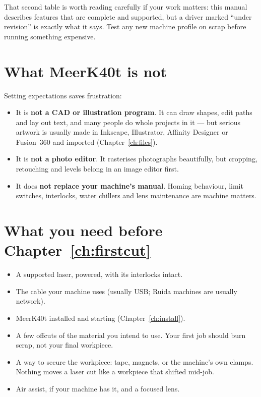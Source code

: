 \noindent That second table is worth reading carefully if your work matters: this
manual describes features that are complete and supported, but a driver marked
``under revision'' is exactly what it says. Test any new machine profile on
scrap before running something expensive.

\section{What MeerK40t is not}

Setting expectations saves frustration:

\begin{itemize}
  \item It is \textbf{not a CAD or illustration program}. It can draw shapes,
        edit paths and lay out text, and many people do whole projects in it ---
        but serious artwork is usually made in Inkscape, Illustrator, Affinity
        Designer or Fusion~360 and imported (Chapter~\ref{ch:files}).
  \item It is \textbf{not a photo editor}. It rasterises photographs beautifully,
        but cropping, retouching and levels belong in an image editor first.
  \item It does \textbf{not replace your machine's manual}. Homing behaviour,
        limit switches, interlocks, water chillers and lens maintenance are
        machine matters.
\end{itemize}

\section{What you need before Chapter~\ref{ch:firstcut}}

\begin{itemize}
  \item A supported laser, powered, with its interlocks intact.
  \item The cable your machine uses (usually USB; Ruida machines are usually
        network).
  \item MeerK40t installed and starting (Chapter~\ref{ch:install}).
  \item A few offcuts of the material you intend to use. Your first job should
        burn scrap, not your final workpiece.
  \item A way to secure the workpiece: tape, magnets, or the machine's own
        clamps. Nothing moves a laser cut like a workpiece that shifted
        mid-job.
  \item Air assist, if your machine has it, and a focused lens.
\end{itemize}

